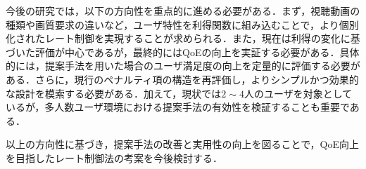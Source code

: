 今後の研究では，以下の方向性を重点的に進める必要がある．まず，視聴動画の種類や画質要求の違いなど，ユーザ特性を利得関数に組み込むことで，より個別化されたレート制御を実現することが求められる．また，現在は利得の変化に基づいた評価が中心であるが，最終的にはQoEの向上を実証する必要がある．具体的には，提案手法を用いた場合のユーザ満足度の向上を定量的に評価する必要がある．さらに，現行のペナルティ項の構造を再評価し，よりシンプルかつ効果的な設計を模索する必要がある．加えて，現状では$2\sim4$人のユーザを対象としているが，多人数ユーザ環境における提案手法の有効性を検証することも重要である．

以上の方向性に基づき，提案手法の改善と実用性の向上を図ることで，QoE向上を目指したレート制御法の考案を今後検討する．